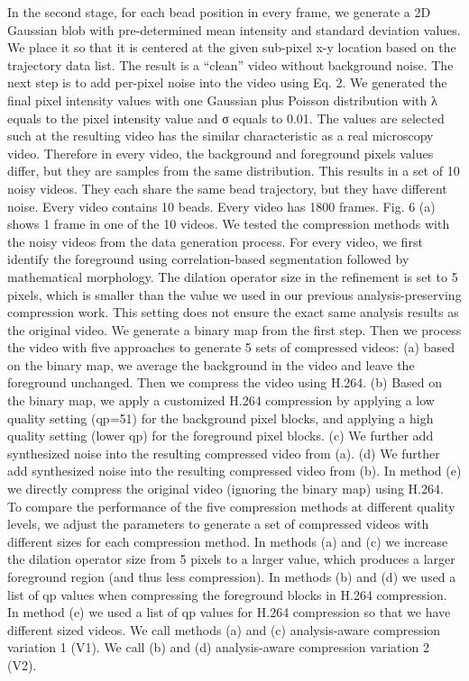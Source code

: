 In the second stage, for each bead position in every frame, we generate a 2D Gaussian blob with pre-determined mean intensity and standard deviation values. We place it so that it is centered at the given sub-pixel x-y location based on the trajectory data list. The result is a “clean” video without background noise.
The next step is to add per-pixel noise into the video using Eq. 2. We generated the final pixel intensity values with one Gaussian plus Poisson distribution with λ equals to the pixel intensity value and σ equals to 0.01. The values are selected such at the resulting video has the similar characteristic as a real microscopy video. Therefore in every video, the background and foreground pixels values differ, but they are samples from the same distribution.
This results in a set of 10 noisy videos. They each share the same bead trajectory, but they have different noise. Every video contains 10 beads. Every video has 1800 frames. Fig. 6 (a) shows 1 frame in one of the 10 videos.
We tested the compression methods with the noisy videos from the data generation process. For every video, we first identify the foreground using correlation-based segmentation followed by mathematical morphology. The dilation operator size in the refinement is set to 5 pixels, which is smaller than the value we used in our previous analysis-preserving compression work. This setting does not ensure the exact same analysis results as the original video. We generate a binary map from the first step. Then we process the video with five approaches to generate 5 sets of compressed videos: (a) based on the binary map, we average the background in the video and leave the foreground unchanged. Then we compress the video using H.264. (b) Based on the binary map, we apply a customized H.264 compression by applying a low quality setting (qp=51) for the background pixel blocks, and applying a high quality setting (lower qp) for the foreground pixel blocks. (c) We further add synthesized noise into the resulting compressed video from (a). (d) We further add synthesized noise into the resulting compressed video from (b). In method (e) we directly compress the original video (ignoring the binary map) using H.264.
To compare the performance of the five compression methods at different quality levels, we adjust the parameters to generate a set of compressed videos with different sizes for each compression method. In methods (a) and (c) we increase the dilation operator size from 5 pixels to a larger value, which produces a larger foreground region (and thus less compression). In methods (b) and (d) we used a list of qp values when compressing the foreground blocks in H.264 compression. In method (e) we used a list of qp values for H.264 compression so that we have different sized videos.  We call methods (a) and (c) analysis-aware compression variation 1 (V1).  We call (b) and (d) analysis-aware compression variation 2 (V2).
